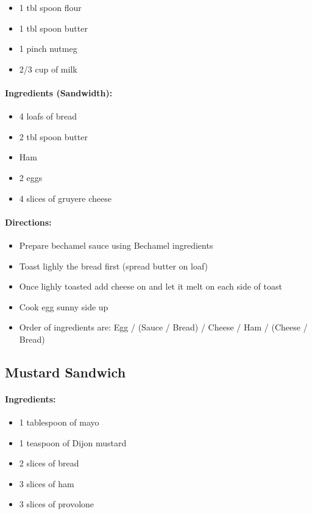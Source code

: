 \documentclass{article}
\begin{document}
\begin{itemize}
	\item 1 tbl spoon flour
	\item 1 tbl spoon butter
	\item 1 pinch nutmeg
	\item 2/3 cup of milk
\end{itemize}

\paragraph{Ingredients (Sandwidth):}

\begin{itemize}
	\item 4 loafs of bread
	\item 2 tbl spoon butter
	\item Ham
	\item 2 eggs
	\item 4 slices of gruyere cheese
\end{itemize}

\paragraph{Directions:}
\begin{itemize}
	\item Prepare bechamel sauce using Bechamel ingredients
	\item Toast lighly the bread first (spread butter on loaf)
	\item Once lighly toasted add cheese on and let it melt on each side of toast
	\item Cook egg sunny side up
	\item Order of ingredients are: Egg / (Sauce / Bread) / Cheese / Ham / (Cheese / Bread)
\end{itemize}


\subsection{Mustard Sandwich}

\paragraph{Ingredients:}

\begin{itemize}
	\item 1 tablespoon of mayo 
	\item 1 teaspoon of Dijon mustard 
	\item 2 slices of bread 
	\item 3 slices of ham 
	\item 3 slices of provolone
\end{itemize}
\end{document}
